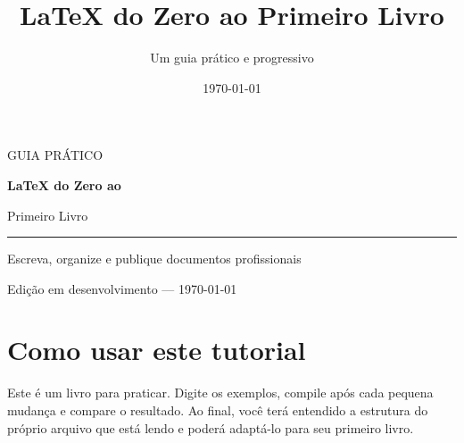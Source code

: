 \documentclass[11pt,openany]{book}
\title{LaTeX do Zero ao Primeiro Livro}
\author{Um guia prático e progressivo}
\date{\today}
\begin{document}
\frontmatter
\begin{titlepage}
  \centering
  \vspace*{2.5cm}
  {\sffamily\color{AzulLivro}\Large GUIA PRÁTICO\par}
  \vspace{1cm}
  {\sffamily\bfseries\fontsize{36}{42}\selectfont
    LaTeX do Zero ao\par Primeiro Livro\par}
  \vspace{1cm}
  {\color{DouradoLivro}\rule{0.7\textwidth}{3pt}\par}
  \vspace{1cm}
  {\Large Escreva, organize e publique documentos profissionais\par}
  \vfill
  {\large Edição em desenvolvimento --- \today\par}
\end{titlepage}

\chapter*{Como usar este tutorial}
Este é um livro para praticar. Digite os exemplos, compile após cada pequena
mudança e compare o resultado. Ao final, você terá entendido a estrutura do
próprio arquivo que está lendo e poderá adaptá-lo para seu primeiro livro.

\tableofcontents

\mainmatter









\backmatter


\printindex
\end{document}
